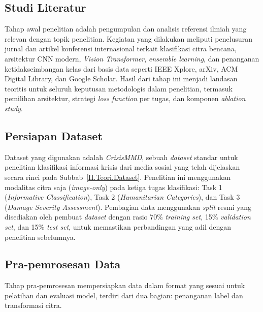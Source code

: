\subsection{Studi Literatur} \label{III.Langkah1}
Tahap awal penelitian adalah pengumpulan dan analisis referensi ilmiah
yang relevan dengan topik penelitian. Kegiatan yang dilakukan meliputi
penelusuran jurnal dan artikel konferensi internasional terkait klasifikasi
citra bencana, arsitektur CNN modern, \textit{Vision Transformer},
\textit{ensemble learning}, dan penanganan ketidakseimbangan kelas dari
basis data seperti IEEE Xplore, arXiv, ACM Digital Library, dan Google
Scholar. Hasil dari tahap ini menjadi landasan teoritis untuk seluruh
keputusan metodologis dalam penelitian, termasuk pemilihan arsitektur,
strategi \textit{loss function} per tugas, dan komponen
\textit{ablation study}. \par

\subsection{Persiapan Dataset} \label{III.Langkah2}
Dataset yang digunakan adalah \textit{CrisisMMD}, sebuah \textit{dataset}
standar untuk penelitian klasifikasi informasi krisis dari media sosial
yang telah dijelaskan secara rinci pada Subbab~\ref{II.Teori.Dataset}.
Penelitian ini menggunakan modalitas citra saja (\textit{image-only})
pada ketiga tugas klasifikasi: Task 1 (\textit{Informative
Classification}), Task 2 (\textit{Humanitarian Categories}), dan Task 3
(\textit{Damage Severity Assessment}). Pembagian data menggunakan
\textit{split} resmi yang disediakan oleh pembuat \textit{dataset} dengan
rasio 70\% \textit{training set}, 15\% \textit{validation set}, dan 15\%
\textit{test set}, untuk memastikan perbandingan yang adil dengan
penelitian sebelumnya. \par

\subsection{Pra-pemrosesan Data} \label{III.Langkah3}
Tahap pra-pemrosesan mempersiapkan data dalam format yang sesuai untuk
pelatihan dan evaluasi model, terdiri dari dua bagian: penanganan label
dan transformasi citra. \par

